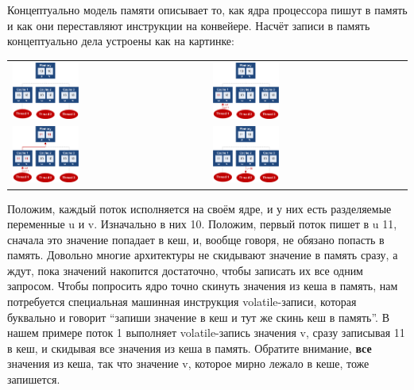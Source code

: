 \documentclass[a5paper]{article}
\begin{document}
Концептуально модель памяти описывает то, как ядра процессора пишут в память и как они переставляют инструкции на конвейере. Насчёт записи в память концептуально дела устроены как на картинке:

\begin{tabu} {X[1 c p] X[1 c p]}
    \includegraphics[width=0.35\textwidth]{volatile1.png} & \includegraphics[width=0.35\textwidth]{volatile2.png} \\
    \includegraphics[width=0.35\textwidth]{volatile3.png} & \includegraphics[width=0.35\textwidth]{volatile4.png} \\
\end{tabu}

Положим, каждый поток исполняется на своём ядре, и у них есть разделяемые переменные u и v. Изначально в них 10. Положим, первый поток пишет в u 11, сначала это значение попадает в кеш, и, вообще говоря, не обязано попасть в память. Довольно многие архитектуры не скидывают значение в память сразу, а ждут, пока значений накопится достаточно, чтобы записать их все одним запросом. Чтобы попросить ядро точно скинуть значения из кеша в память, нам потребуется специальная машинная инструкция volatile-записи, которая буквально и говорит ``запиши значение в кеш и тут же скинь кеш в память''. В нашем примере поток 1 выполняет volatile-запись значения v, сразу записывая 11 в кеш, и скидывая все значения из кеша в память. Обратите внимание, \textbf{все} значения из кеша, так что значение v, которое мирно лежало в кеше, тоже запишется. 
\end{document}
